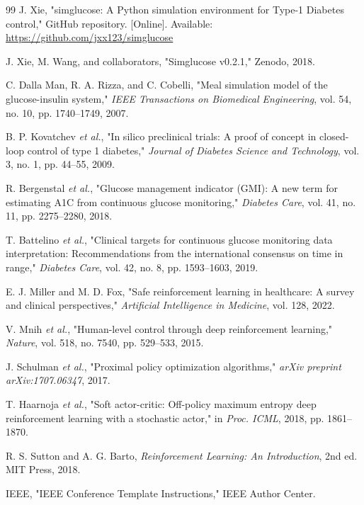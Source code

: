 \documentclass[conference]{IEEEtran}
\begin{document}
\begin{thebibliography}{99}
J. Xie, "simglucose: A Python simulation environment for Type-1 Diabetes control," GitHub repository. [Online]. Available: \url{https://github.com/jxx123/simglucose}

J. Xie, M. Wang, and collaborators, "Simglucose v0.2.1," Zenodo, 2018.

C. Dalla Man, R. A. Rizza, and C. Cobelli, "Meal simulation model of the glucose-insulin system," \emph{IEEE Transactions on Biomedical Engineering}, vol. 54, no. 10, pp. 1740--1749, 2007.

B. P. Kovatchev \emph{et al.}, "In silico preclinical trials: A proof of concept in closed-loop control of type 1 diabetes," \emph{Journal of Diabetes Science and Technology}, vol. 3, no. 1, pp. 44--55, 2009.

R. Bergenstal \emph{et al.}, "Glucose management indicator (GMI): A new term for estimating A1C from continuous glucose monitoring," \emph{Diabetes Care}, vol. 41, no. 11, pp. 2275--2280, 2018.

T. Battelino \emph{et al.}, "Clinical targets for continuous glucose monitoring data interpretation: Recommendations from the international consensus on time in range," \emph{Diabetes Care}, vol. 42, no. 8, pp. 1593--1603, 2019.

E. J. Miller and M. D. Fox, "Safe reinforcement learning in healthcare: A survey and clinical perspectives," \emph{Artificial Intelligence in Medicine}, vol. 128, 2022.

V. Mnih \emph{et al.}, "Human-level control through deep reinforcement learning," \emph{Nature}, vol. 518, no. 7540, pp. 529--533, 2015.

J. Schulman \emph{et al.}, "Proximal policy optimization algorithms," \emph{arXiv preprint arXiv:1707.06347}, 2017.

T. Haarnoja \emph{et al.}, "Soft actor-critic: Off-policy maximum entropy deep reinforcement learning with a stochastic actor," in \emph{Proc. ICML}, 2018, pp. 1861--1870.

R. S. Sutton and A. G. Barto, \emph{Reinforcement Learning: An Introduction}, 2nd ed. MIT Press, 2018.

IEEE, "IEEE Conference Template Instructions," IEEE Author Center.
\end{thebibliography}
\end{document}
